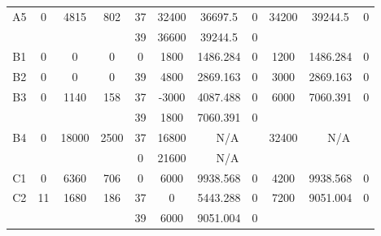 \begin{sidewaystable}
\begin{tabular}{c||c|c|c||c|c|c|c||c|c|c}
        
      \\
      \hline
      \multirow{2}{*}{A5} &
      \multirow{2}{*}{0} &
      \multirow{2}{*}{4815} &
      \multirow{2}{*}{802} &
      37 &
      32400 &
        36697.5 &
        0 &
      \multirow{2}{*}{34200} &
        \multirow{2}{*}{39244.5} &
        \multirow{2}{*}{0}
      \\
      \cline{5-8}
       &
       &
       &
       &
      39 &
      36600 &
        39244.5 &
        0 &
      
         &
        
      \\
      \hline
      \multirow{1}{*}{B1} &
      \multirow{1}{*}{0} &
      \multirow{1}{*}{0} &
      \multirow{1}{*}{0} &
      0 &
      1800 &
        1486.284 &
        0 &
      \multirow{1}{*}{1200} &
        \multirow{1}{*}{1486.284} &
        \multirow{1}{*}{0}
      \\
      \hline
      \multirow{1}{*}{B2} &
      \multirow{1}{*}{0} &
      \multirow{1}{*}{0} &
      \multirow{1}{*}{0} &
      39 &
      4800 &
        2869.163 &
        0 &
      \multirow{1}{*}{3000} &
        \multirow{1}{*}{2869.163} &
        \multirow{1}{*}{0}
      \\
      \hline
      \multirow{2}{*}{B3} &
      \multirow{2}{*}{0} &
      \multirow{2}{*}{1140} &
      \multirow{2}{*}{158} &
      37 &
      -3000 &
        4087.488 &
        0 &
      \multirow{2}{*}{6000} &
        \multirow{2}{*}{7060.391} &
        \multirow{2}{*}{0}
      \\
      \cline{5-8}
       &
       &
       &
       &
      39 &
      1800 &
        7060.391 &
        0 &
      
         &
        
      \\
      \hline
      \multirow{2}{*}{B4} &
      \multirow{2}{*}{0} &
      \multirow{2}{*}{18000} &
      \multirow{2}{*}{2500} &
      37 &
      16800 &
        \multicolumn{2}{|c||}{N/A} &
      \multirow{2}{*}{32400} &
        \multicolumn{2}{c}{\multirow{2}{*}{N/A}}
      \\
      \cline{5-8}
       &
       &
       &
       &
      0 &
      21600 &
        \multicolumn{2}{|c||}{N/A} &
      
        
      \\
      \hline
      \multirow{1}{*}{C1} &
      \multirow{1}{*}{0} &
      \multirow{1}{*}{6360} &
      \multirow{1}{*}{706} &
      0 &
      6000 &
        9938.568 &
        0 &
      \multirow{1}{*}{4200} &
        \multirow{1}{*}{9938.568} &
        \multirow{1}{*}{0}
      \\
      \hline
      \multirow{2}{*}{C2} &
      \multirow{2}{*}{11} &
      \multirow{2}{*}{1680} &
      \multirow{2}{*}{186} &
      37 &
      0 &
        5443.288 &
        0 &
      \multirow{2}{*}{7200} &
        \multirow{2}{*}{9051.004} &
        \multirow{2}{*}{0}
      \\
      \cline{5-8}
       &
       &
       &
       &
      39 &
      6000 &
        9051.004 &
        0 &
      

\end{tabular}
\end{sidewaystable}
